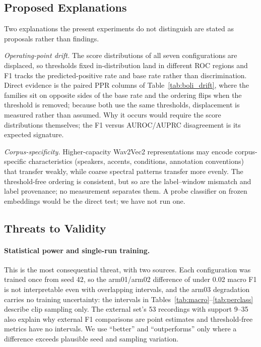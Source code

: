 \documentclass[a4paper,orivec]{llncs}
\begin{document}
\subsection{Proposed Explanations}
\label{sec:hypotheses}
Two explanations the present experiments do not distinguish are stated as
proposals rather than findings.

\emph{Operating-point drift.} The score distributions of all seven configurations
are displaced, so thresholds fixed in-distribution land in different ROC regions
and F1 tracks the predicted-positive rate and base rate rather than
discrimination. Direct evidence is the paired PPR columns of
Table~\ref{tab:boli_drift}, where the families sit on opposite sides of the base
rate and the ordering flips when the threshold is removed; because both use the
same thresholds, displacement is measured rather than assumed. Why it occurs
would require the score distributions themselves; the F1 versus AUROC/AUPRC
disagreement is its expected signature.

\emph{Corpus-specificity.} Higher-capacity Wav2Vec2 representations may encode
corpus-specific characteristics (speakers, accents, conditions, annotation
conventions) that transfer weakly, while coarse spectral patterns transfer more
evenly. The threshold-free ordering is consistent, but so are the label--window
mismatch and label provenance; no measurement separates them. A probe classifier
on frozen embeddings would be the direct test; we have not run one.

\subsection{Threats to Validity}
\label{sec:limitations}
\paragraph{Statistical power and single-run training.} This is the most
consequential threat, with two sources. Each configuration was trained once from
seed 42, so the arm01/arm02 difference of under 0.02 macro F1 is not interpretable
even with overlapping intervals, and the arm03 degradation carries no training
uncertainty: the intervals in Tables~\ref{tab:macro}--\ref{tab:perclass} describe
clip sampling only. The external set's 53 recordings with support 9--35 also
explain why external F1 comparisons are point estimates and threshold-free
metrics have no intervals. We use ``better'' and ``outperforms'' only where a
difference exceeds plausible seed and sampling variation.
\end{document}
